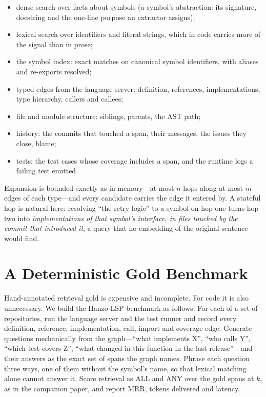 \documentclass[11pt]{article}
\begin{document}
\begin{itemize}
  \item dense search over facts about symbols (a symbol's abstraction: its
        signature, docstring and the one-line purpose an extractor assigns);
  \item lexical search over identifiers and literal strings, which in code
        carries more of the signal than in prose;
  \item the symbol index: exact matches on canonical symbol identifiers, with
        aliases and re-exports resolved;
  \item typed edges from the language server: definition, references,
        implementations, type hierarchy, callers and callees;
  \item file and module structure: siblings, parents, the AST path;
  \item history: the commits that touched a span, their messages, the issues
        they close, blame;
  \item tests: the test cases whose coverage includes a span, and the runtime
        logs a failing test emitted.
\end{itemize}

Expansion is bounded exactly as in memory---at most $n$ hops along at most
$m$ edges of each type---and every candidate carries the edge it entered by.
A stateful hop is natural here: resolving ``the retry logic'' to a symbol on
hop one turns hop two into \emph{implementations of that symbol's
interface, in files touched by the commit that introduced it}, a query that
no embedding of the original sentence would find.

\section{A Deterministic Gold Benchmark}
\label{sec:lsp}

Hand-annotated retrieval gold is expensive and incomplete. For code it is
also unnecessary. We build the Hanzo LSP benchmark as follows. For each of
a set of repositories, run the language server and the test runner and
record every definition, reference, implementation, call, import and
coverage edge. Generate questions mechanically from the graph---``what
implements X'', ``who calls Y'', ``which test covers Z'', ``what changed in
this function in the last release''---and their answers as the exact set of
spans the graph names. Phrase each question three ways, one of them without
the symbol's name, so that lexical matching alone cannot answer it. Score
retrieval as ALL and ANY over the gold spans at $k$, as in the companion
paper, and report MRR, tokens delivered and latency.
\end{document}
